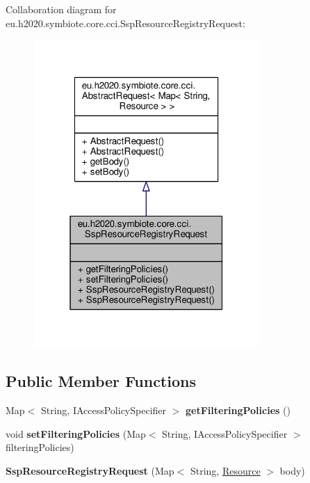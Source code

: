 Collaboration diagram for eu.\+h2020.\+symbiote.\+core.\+cci.\+Ssp\+Resource\+Registry\+Request\+:
\nopagebreak
\begin{figure}[H]
\begin{center}
\leavevmode
\includegraphics[width=244pt]{classeu_1_1h2020_1_1symbiote_1_1core_1_1cci_1_1SspResourceRegistryRequest__coll__graph}
\end{center}
\end{figure}
\subsection*{Public Member Functions}
\begin{DoxyCompactItemize}
\item 
\mbox{\label{classeu_1_1h2020_1_1symbiote_1_1core_1_1cci_1_1SspResourceRegistryRequest_abed199c63e44e2d50219683245fc6688}} 
Map$<$ String, I\+Access\+Policy\+Specifier $>$ {\bfseries get\+Filtering\+Policies} ()
\item 
\mbox{\label{classeu_1_1h2020_1_1symbiote_1_1core_1_1cci_1_1SspResourceRegistryRequest_ac7199cae7b405c912934065f9c212018}} 
void {\bfseries set\+Filtering\+Policies} (Map$<$ String, I\+Access\+Policy\+Specifier $>$ filtering\+Policies)
\item 
\mbox{\label{classeu_1_1h2020_1_1symbiote_1_1core_1_1cci_1_1SspResourceRegistryRequest_a426df97c98260e639a36d91bd2b0903e}} 
{\bfseries Ssp\+Resource\+Registry\+Request} (Map$<$ String, \hyperlink{classeu_1_1h2020_1_1symbiote_1_1model_1_1cim_1_1Resource}{Resource} $>$ body)
\end{DoxyCompactItemize}


